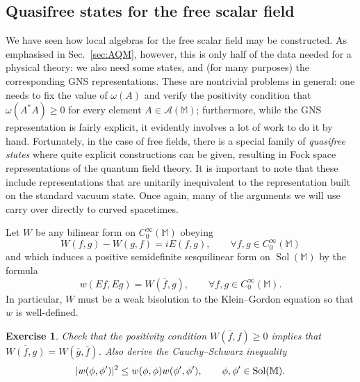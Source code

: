 \documentclass[12pt]{article}
\let\Im\relax
\DeclareMathOperator{\Im}{Im}
\newcommand{\1}{\mathds{1}}                         %
\newcommand{\MM}{\mathbb{M}}
\newcommand{\Ac}{{\mathcal{A}}}
\newcommand{\CoinX}[1]{C_0^\infty(#1)}
\newcommand{\ip}[2]{\langle #1|#2\rangle}
\newtheorem{exercise}[theorem]{Exercise}
\DeclareMathOperator{\Sol}{Sol}
\begin{document}
%

\subsection{Quasifree states for the free scalar field}\label{sec:quasifree} 
 
We have seen how local algebras for the free scalar field may be constructed.  
As emphasised in Sec.~\ref{sec:AQM}, however, this is only half of the data needed for
a physical theory: we also need some states, and (for many purposes) the corresponding 
GNS representations. These are nontrivial problems in general: one needs to fix the value of $\omega(A)$ and verify the positivity
condition that $\omega(A^*A)\ge 0$ for every element $A\in\Ac(\MM)$;
furthermore, while the GNS representation is fairly explicit, it evidently involves a lot of work to do it by hand. Fortunately, in the case of free fields, there is a special family of \emph{quasifree states} where quite explicit constructions can be given, resulting in Fock space representations of the quantum field theory. It is important to note that these include representations that are unitarily inequivalent to the representation built on the standard vacuum state. Once again, many of the arguments we will use carry over directly to curved spacetimes. 

Let $W$ be any bilinear form on $\CoinX{\MM}$ obeying
\begin{equation}\label{eq:WE}
W(f,g) - W(g,f) = i E(f,g), \qquad \forall f,g\in\CoinX{\MM}
\end{equation}
and which induces a positive semidefinite sesquilinear form on $\Sol(\MM)$ by the formula 
\[
w(Ef,Eg) = W(\overline{f},g), \qquad \forall f,g\in\CoinX{\MM}.
\]  
In particular, $W$ must be a weak bisolution to the Klein--Gordon equation so that $w$ is well-defined. 
\begin{exercise}
Check that the positivity condition $W(\bar{f},f)\ge 0$ implies that 
$\overline{W(f,g)}=W(\bar{g},\bar{f})$. Also derive the Cauchy--Schwarz inequality
\begin{equation}\label{eq:CSw}
|\Im w(\phi,\phi')|^2 \le w(\phi,\phi)w(\phi',\phi'), \qquad \phi,\phi'\in\Sol(\MM).
\end{equation}
\end{exercise}
\end{document}

